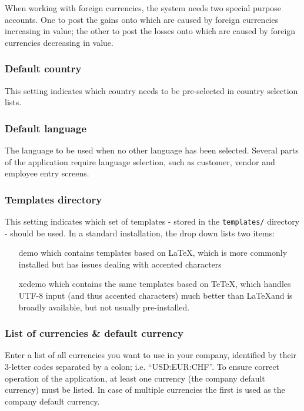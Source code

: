When working with foreign currencies,
the system needs two special purpose accounts. One to post the gains onto which are
caused by foreign currencies increasing in value; the other to post the losses onto
which are caused by foreign currencies decreasing in value.


\subsubsection{Default country}
\label{subsubsec-company-config-defaults-country}

This setting indicates which country needs to be pre-selected
   in country selection lists.


\subsubsection{Default language}
\label{subsubsec-company-config-defaults-language}

The language to be used when no other language has been selected. Several parts of the
application require language selection, such as customer, vendor and employee entry screens.

\subsubsection{Templates directory}
\label{subsubsec-company-config-defaults-templates}

This setting indicates which set of templates - stored in the
   \texttt{templates/} directory - should be used. In a standard installation, the drop down
   lists two items:
   \begin{itemize}
   \item [demo] which contains templates based on \LaTeX, which is more commonly installed but has issues dealing with accented characters
   \item [xedemo] which contains the same templates based on TeTeX, which handles UTF-8 input (and thus accented characters) much better than \LaTeX and is broadly available, but not usually pre-installed.
   \end{itemize}


\subsubsection{List of currencies \& default currency}
\label{subsubsec-company-config-defaults-currencies}

Enter a list of all currencies you want
to use in your company, identified by their 3-letter codes separated by a colon; i.e.
``USD:EUR:CHF''. To ensure correct operation of the application, at least one currency
(the company default currency) must be listed. In case of multiple currencies the first
is used as the company default currency.

